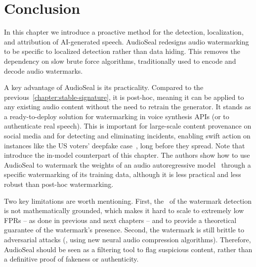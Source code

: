 \section{Conclusion}

In this chapter we introduce a proactive method for the detection, localization, and attribution of AI-generated speech. 
AudioSeal redesigns audio watermarking to be specific to localized detection rather than data hiding. 
This removes the dependency on slow brute force algorithms, traditionally used to encode and decode audio watermarks.

A key advantage of AudioSeal is its practicality. 
Compared to the previous~\autoref{chapter:stable-signature}, it is post-hoc, meaning it can be applied to any existing audio content without the need to retrain the generator.
It stands as a ready-to-deploy solution for watermarking in voice synthesis APIs (or to authenticate real speech).
This is important for large-scale content provenance on social media and for detecting and eliminating incidents, enabling swift action on instances like the US voters' deepfake case~\citep{murphy2024biden}, long before they spread.
Note that \citet{san2024latent} introduce the in-model counterpart of this chapter.
The authors show how to use AudioSeal to watermark the weights of an audio autoregressive model~\citep{copet2023simple} through a specific watermarking of its training data, although it is less practical and less robust than post-hoc watermarking.

Two key limitations are worth mentioning.
First, the \pval\ of the watermark detection is not mathematically grounded, which makes it hard to scale to extremely low FPRs -- as done in previous and next chapters -- and to provide a theoretical guarantee of the watermark's presence.
Second, the watermark is still brittle to adversarial attacks (\eg, using new neural audio compression algorithms).
Therefore, AudioSeal should be seen as a filtering tool to flag suspicious content, rather than a definitive proof of fakeness  or authenticity.

